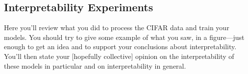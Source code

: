 \subsection{Interpretability Experiments}

Here you'll review what you did to process the CIFAR data and train your models.
You should try to give some example of what you saw, in a figure---just enough to get
an idea and to support your conclusions about interpretability.
You'll then state your [hopefully collective] opinion on the interpretability of
these models in particular and on interpretability in general.